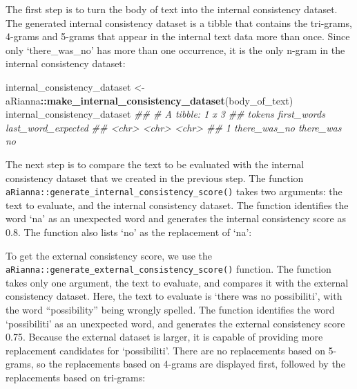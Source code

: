 \documentclass[11pt,]{article}
\newenvironment{Shaded}{\begin{snugshade}}{\end{snugshade}}
\newcommand{\CommentTok}[1]{\textcolor[rgb]{0.56,0.35,0.01}{\textit{#1}}}
\newcommand{\KeywordTok}[1]{\textcolor[rgb]{0.13,0.29,0.53}{\textbf{#1}}}
\newcommand{\NormalTok}[1]{#1}
\newcommand{\OperatorTok}[1]{\textcolor[rgb]{0.81,0.36,0.00}{\textbf{#1}}}
\newcommand{\StringTok}[1]{\textcolor[rgb]{0.31,0.60,0.02}{#1}}
\begin{document}
The first step is to turn the body of text into the internal consistency dataset. The generated internal consistency dataset is a tibble that contains the tri-grams, 4-grams and 5-grams that appear in the internal text data more than once. Since only `there\_was\_no' has more than one occurrence, it is the only n-gram in the internal consistency dataset:

\begin{Shaded}
\begin{Highlighting}[]
\NormalTok{internal_consistency_dataset <-}\StringTok{ }
\StringTok{  }\NormalTok{aRianna}\OperatorTok{::}\KeywordTok{make_internal_consistency_dataset}\NormalTok{(body_of_text)}
\NormalTok{internal_consistency_dataset}
\CommentTok{## # A tibble: 1 x 3}
\CommentTok{##   tokens       first_words last_word_expected}
\CommentTok{##   <chr>        <chr>       <chr>             }
\CommentTok{## 1 there_was_no there_was   no                }
\end{Highlighting}
\end{Shaded}

The next step is to compare the text to be evaluated with the internal consistency dataset that we created in the previous step. The function \texttt{aRianna::generate\_internal\_consistency\_score()} takes two arguments: the text to evaluate, and the internal consistency dataset. The function identifies the word `na' as an unexpected word and generates the internal consistency score as 0.8. The function also lists `no' as the replacement of `na':

\begin{Shaded}
\end{Shaded}

To get the external consistency score, we use the \texttt{aRianna::generate\_external\_consistency\_score()} function. The function takes only one argument, the text to evaluate, and compares it with the external consistency dataset. Here, the text to evaluate is `there was no possibiliti', with the word ``possibility'' being wrongly spelled. The function identifies the word `possibiliti' as an unexpected word, and generates the external consistency score 0.75. Because the external dataset is larger, it is capable of providing more replacement candidates for `possibiliti'. There are no replacements based on 5-grams, so the replacements based on 4-grams are displayed first, followed by the replacements based on tri-grams:
\end{document}

